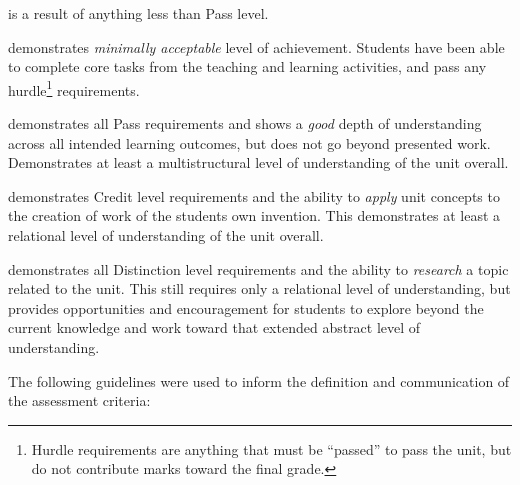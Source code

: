 \begin{description}
	\item[Fail] is a result of anything less than Pass level.
	\item[Pass] demonstrates \emph{minimally acceptable} level of achievement. Students have been able to complete core tasks from the teaching and learning activities, and pass any hurdle\footnote{Hurdle requirements are anything that must be ``passed'' to pass the unit, but do not contribute marks toward the final grade.} requirements.
	\item[Credit] demonstrates all Pass requirements and shows a \emph{good} depth of understanding across all intended learning outcomes, but does not go beyond presented work. Demonstrates at least a multistructural level of understanding of the unit overall.
	\item[Distinction] demonstrates Credit level requirements and the ability to \emph{apply} unit concepts to the creation of work of the students own invention. This demonstrates at least a relational level of understanding of the unit overall.
	\item[High Distinction] demonstrates all Distinction level requirements and the ability to \emph{research} a topic related to the unit. This still requires only a relational level of understanding, but provides opportunities and encouragement for students to explore beyond the current knowledge and work toward that extended abstract level of understanding.
\end{description}

\clearpage 

The following guidelines were used to inform the definition and communication of the assessment criteria:

%
% 

